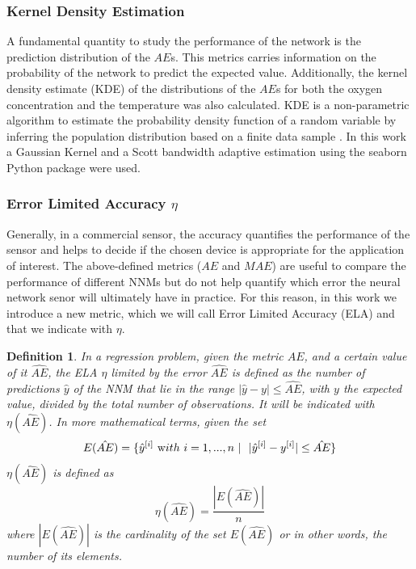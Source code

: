 \documentclass[9pt,twocolumn,twoside,pdftex]{optica}
\newtheorem*{definition*}{Definition}
\begin{document}
\subsubsection{Kernel Density Estimation}

A fundamental quantity to study the performance of the network is the prediction distribution of the $AE$s. This metrics carries information on the probability of the network to predict the expected value. Additionally, the kernel density estimate (KDE) of the distributions of the $AE$s for both the oxygen concentration and the temperature was also calculated. KDE is a non-parametric algorithm to estimate the probability density function of a random variable by inferring the population distribution based on a finite data sample \cite{Hastie2009}.  In this work a Gaussian Kernel and a Scott bandwidth adaptive estimation \cite{Sain1996} using the seaborn Python package \cite{Waskom2020} were used.


\subsubsection{Error Limited Accuracy $\eta$}
\label{sektion:ela}

Generally, in a commercial sensor, the accuracy quantifies the performance of the sensor and helps to decide if the chosen device is appropriate for the application of interest. The above-defined metrics ($AE$ and $MAE$) are useful to compare the performance of different NNMs but do not help quantify which error the neural network senor will ultimately have in practice.
For this reason, in this work we introduce a new metric, which we will call Error Limited Accuracy (ELA) and that we indicate with $\eta$.

\begin{definition*}
In a regression problem, given the metric $AE$, and a certain value of it $\hat{AE}$, the ELA  $\eta$ limited by the error $\hat{AE}$ is defined as the number of predictions $\hat y$ of the NNM that lie in the range $|\hat y-y|\leq \hat{AE}$, with $y$ the expected value, divided by the total number of observations. It will be indicated with $\eta(\hat{AE})$. In more mathematical terms, given the set
\begin{equation}
E(\hat{AE}) = \{ \hat y^{[i]} \ {\text with } \ i = 1,..., n\ | \ \ |\hat y^{[i]}-y^{[i]}|\leq \hat{AE} \} 
\end{equation}
$\eta(\hat{AE})$ is defined as
\begin{equation}
\eta(\hat{AE}) = \frac{|E(\hat{AE})|}{n}
\end{equation}
where $|E(\hat{AE})|$ is the cardinality of the set $E(\hat{AE})$ or in other words, the number of its elements.
\end{definition*}
\end{document}
